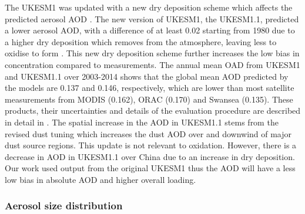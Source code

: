 The UKESM1 was updated with a new dry deposition scheme which affects the predicted aerosol AOD \citep{mulcahyUKESM1DevelopmentEvaluation2022}. The new version of UKESM1, the UKESM1.1, predicted a lower aerosol AOD, with a difference of at least 0.02 starting from 1980 due to a higher  dry deposition which removes  from the atmosphere, leaving less to oxidise to form . This new dry deposition scheme further increases the low bias in  concentration compared to measurements. The annual mean OAD from UKESM1 and UKESM1.1 over 2003-2014 shows that the global mean AOD predicted by the models are 0.137 and 0.146, respectively, which are lower than most satellite measurements from MODIS (0.162), ORAC (0.170) and Swansea (0.135). These products, their uncertainties and details of the evaluation procedure are described in detail in \citet{mulcahyDescriptionEvaluationAerosol2020}. The spatial increase in the AOD in UKESM1.1 stems from the revised dust tuning which increases the dust AOD over and downwind of major dust source regions. This update is not relevant to  oxidation. However, there is a decrease in AOD in UKESM1.1 over China due to an increase in  dry deposition. Our work used output from the original UKESM1 thus the AOD will have a less low bias in absolute AOD and higher overall  loading.



\subsubsection{Aerosol size distribution}
\label{sec:result:aerosol-size-dist}

